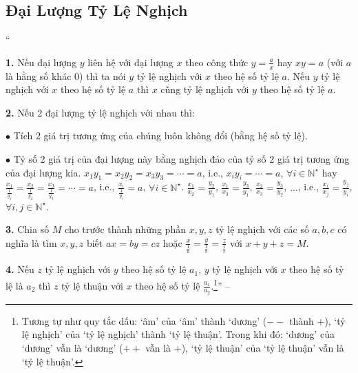 \documentclass{article}
\numberwithin{equation}{section}
\begin{document}

\subsection{Đại Lượng Tỷ Lệ Nghịch}
``\begin{enumerate*}
	\item[\textbf{1.}] Nếu đại lượng $y$ liên hệ với đại lượng $x$ theo công thức $y = \frac{a}{x}$ hay $xy = a$ (với $a$ là hằng số khác $0$) thì ta nói $y$ tỷ lệ nghịch với $x$ theo hệ số tỷ lệ $a$. Nếu $y$ tỷ lệ nghịch với $x$ theo hệ số tỷ lệ $a$ thì $x$ cũng tỷ lệ nghịch với $y$ theo hệ số tỷ lệ $a$.
	\item[\textbf{2.}] Nếu 2 đại lượng tỷ lệ nghịch với nhau thì:
	\begin{enumerate*}
		\item[$\bullet$] Tích 2 giá trị tương ứng của chúng luôn không đổi (bằng hệ số tỷ lệ).
		\item[$\bullet$] Tỷ số 2 giá trị của đại lượng này bằng nghịch đảo của tỷ số 2 giá trị tương ứng của đại lượng kia. $x_1y_1 = x_2y_2 = x_3y_3 = \cdots = a$, i.e., $x_iy_i = \cdots = a$, $\forall i\in\mathbb{N}^\star$ hay $\frac{x_1}{\frac{1}{y_1}} = \frac{x_2}{\frac{1}{y_2}} = \frac{x_3}{\frac{1}{y_3}} = \cdots = a$, i.e., $\frac{x_i}{\frac{1}{y_i}} = a$, $\forall i\in\mathbb{N}^\star$. $\frac{x_1}{x_2} = \frac{y_2}{y_1}$, $\frac{x_1}{x_3} = \frac{y_3}{y_1}$, $\frac{x_2}{x_3} = \frac{y_3}{y_2}$, $\ldots$, i.e., $\frac{x_i}{x_j} = \frac{y_j}{y_i}$, $\forall i,j\in\mathbb{N}^\star$.
	\end{enumerate*}
	\item[\textbf{3.}] Chia số $M$ cho trước thành những phần $x,y,z$ tỷ lệ nghịch với các số $a,b,c$ có nghĩa là tìm $x,y,z$ biết $ax = by = cz$ hoặc $\frac{x}{\frac{1}{a}} = \frac{y}{\frac{1}{b}} = \frac{z}{\frac{1}{c}}$ với $x + y + z = M$.
	\item[\textbf{4.}] Nếu $z$ tỷ lệ nghịch với $y$ theo hệ số tỷ lệ $a_1$, $y$ tỷ lệ nghịch với $x$ theo hệ số tỷ lệ là $a_2$ thì $z$ tỷ lệ thuận với $x$ theo hệ số tỷ lệ $\frac{a_1}{a_2}$.\footnote{Tương tự như quy tắc dấu: `âm' của `âm' thành `dương' ($--$ thành $+$), `tỷ lệ nghịch' của `tỷ lệ nghịch' thành `tỷ lệ thuận'. Trong khi đó: `dương' của `dương' vẫn là `dương' ($++$ vẫn là $+$), `tỷ lệ thuận' của `tỷ lệ thuận' vẫn là `tỷ lệ thuận'.}'' -- \cite[Chap. 2, \S8, p. 33]{Tuyen_Toan_7}
\end{enumerate*}
\end{document}
